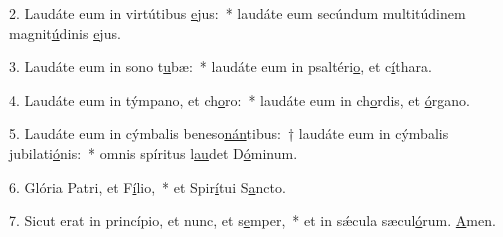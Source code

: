 2. Laudáte eum in virtútibus \uline{e}jus:~* laudáte eum secúndum multitúdinem magnit\uline{ú}dinis \uline{e}jus.\par 
3. Laudáte eum in sono t\uline{u}bæ:~* laudáte eum in psaltéri\uline{o}, et c\uline{í}thara.\par 
4. Laudáte eum in týmpano, et ch\uline{o}ro:~* laudáte eum in ch\uline{o}rdis, et \uline{ó}rgano.\par 
5. Laudáte eum in cýmbalis beneso\uline{nán}tibus:~† laudáte eum in cýmbalis jubilati\uline{ó}nis:~* omnis spíritus l\uline{au}det D\uline{ó}minum.\par 
6. Glória Patri, et F\uline{í}lio,~* et Spir\uline{í}tui S\uline{a}ncto.\par 
7. Sicut erat in princípio, et nunc, et s\uline{e}mper,~* et in sǽcula sæcul\uline{ó}rum. \uline{A}men.\par 
